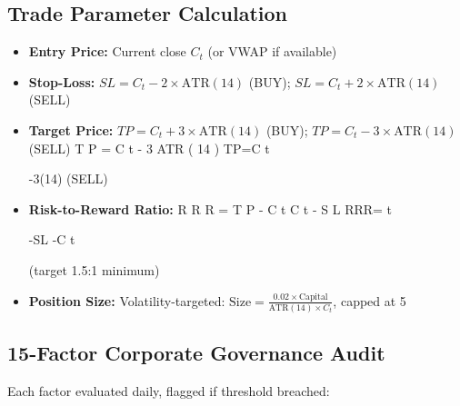 \documentclass[12pt,a4paper]{report}
\begin{document}
\subsection{Trade Parameter Calculation}
\begin{itemize}
\item \textbf{Entry Price:} Current close $C_t$ (or VWAP if available)
\item \textbf{Stop-Loss:} $SL = C_t - 2 \times \text{ATR}(14)$ (BUY); $SL = C_t + 2 \times \text{ATR}(14)$ (SELL)
\item \textbf{Target Price:} $TP = C_t + 3 \times \text{ATR}(14)$ (BUY); $TP = C_t - 3 \times \text{ATR}(14)$ (SELL) 
T
P
=
C
t
-
3
\times
ATR
(
14
)
TP=C 
t

 -3\timesATR(14) (SELL)
\item \textbf{Risk-to-Reward Ratio:} 
R
R
R
=
\mid
T
P
-
C
t
\mid
\mid
C
t
-
S
L
\mid
RRR= 
\midC 
t

 -SL\mid
\midTP-C 
t

 \mid

  (target 1.5:1 minimum)
\item \textbf{Position Size:} Volatility-targeted: $\text{Size} = \frac{0.02 \times \text{Capital}}{\text{ATR}(14) \times C_t}$, capped at 5%
\end{itemize}

\subsection{15-Factor Corporate Governance Audit}
Each factor evaluated daily, flagged if threshold breached:
\end{document}
